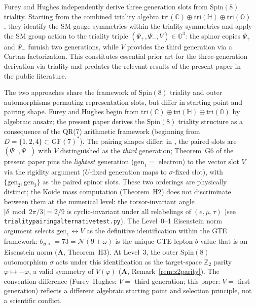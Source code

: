 \documentclass[11pt]{article}
\theoremstyle{remark}
\newcommand{\lean}[1]{%
  \penalty-100
  \begingroup\def\_{\textunderscore\allowbreak}\texttt{#1}\endgroup}
\newcommand{\CatA}{\textbf{A}}
\begin{document}
Furey and Hughes \cite{FureyHughes2025} independently derive three generation
slots from $\mathrm{Spin}(8)$ triality.
Starting from the combined triality algebra
$\mathrm{tri}(\mathbb{C})\oplus\mathrm{tri}(\mathbb{H})\oplus\mathrm{tri}(\mathbb{O})$,
they identify the SM gauge symmetries within the triality symmetries and apply the
SM group action to the triality triple $(\Psi_+, \Psi_-, V)\in\mathbb{O}^3$:
the spinor copies $\Psi_+$ and $\Psi_-$ furnish two generations, while $V$
provides the third generation via a Cartan factorization.
This constitutes essential prior art for the three-generation derivation via triality
and predates the relevant results of the present paper in the public literature.

The two approaches share the framework of $\mathrm{Spin}(8)$ triality and outer
automorphisms permuting representation slots, but differ in starting point and
pairing shape.
Furey and Hughes begin from
$\mathrm{tri}(\mathbb{C})\oplus\mathrm{tri}(\mathbb{H})\oplus\mathrm{tri}(\mathbb{O})$
by algebraic ansatz; the present paper derives the $\mathrm{Spin}(8)$ triality
structure as a consequence of the QR(7) arithmetic framework
(beginning from $D = \{1,2,4\}\subset\mathrm{GF}(7)^*$).
The pairing shapes differ: in \cite{FureyHughes2025}, the paired slots are
$(\Psi_+, \Psi_-)$ with $V$ distinguished as the \emph{third} generation;
Theorem~G6 of the present paper pins the \emph{lightest} generation
($\mathrm{gen}_1 =$ electron) to the vector slot $V$ via the rigidity argument
($U$-fixed generation maps to $\sigma$-fixed slot), with
$\{\mathrm{gen}_2, \mathrm{gen}_3\}$ as the paired spinor slots.
These two orderings are physically distinct; the Koide mass computation
(Theorem~H2) does not discriminate between them at the numerical level: the
torsor-invariant angle $|\delta\bmod 2\pi/3| = 2/9$ is cyclic-invariant under
all relabelings of $(e,\mu,\tau)$ (see \lean{triality\_pairing\_alternative\_test.py}).
The Level~0--1 Eisenstein norm argument selects $\mathrm{gen}_1\leftrightarrow V$
as the definitive identification within the GTE framework:
$b_{\mathrm{gen}_1} = 73 = \mathcal{N}(9+\omega)$ is the unique GTE lepton
$b$-value that is an Eisenstein norm (\CatA, Theorem~H3).
At Level~3, the outer $\mathrm{Spin}(8)$ automorphism $\sigma$ acts under this
identification as the target-space $\mathbb{Z}_2$ parity $\varphi\mapsto -\varphi$,
a valid symmetry of $V(\varphi)$ (\CatA, Remark~\ref{rem:z2parity}).
The convention difference (Furey--Hughes: $V = $ third generation; this paper:
$V = $ first generation) reflects a different algebraic starting point and selection
principle, not a scientific conflict.
\end{document}
